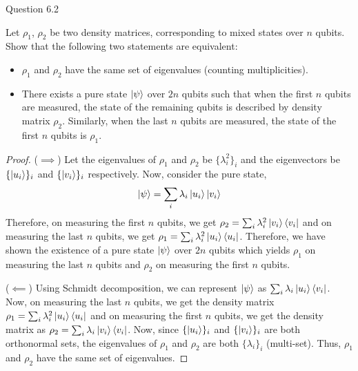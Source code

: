 \begin{solution}{Question 6.2}\label{ques:62}
    \begin{question}
        Let $\rho_1$, $\rho_2$ be two density matrices, corresponding to mixed states over $n$ qubits. Show that the following two statements are equivalent:
        \begin{itemize}
            \item $\rho_1$ and $\rho_2$ have the same set of eigenvalues (counting multiplicities).
            \item There exists a pure state $\ket{\psi}$ over $2n$ qubits such that when the first $n$ qubits are measured, the state of the remaining qubits is described by density matrix $\rho_2$. Similarly, when the last $n$ qubits are measured, the state of the first $n$ qubits is $\rho_1$.
        \end{itemize}
    \end{question}
    \tcblower{}
    \begin{proof}
        ($\implies$) Let the eigenvalues of $\rho_1$ and $\rho_2$ be $\{\lambda_i^2\}_i$ and the eigenvectors be $\{\ket{u_i}\}_i$ and $\{\ket{v_i}\}_i$ respectively. Now, consider the pure state,
        \begin{equation}
            \ket{\psi} = \sum_i\lambda_i\ket{u_i}\ket{v_i}
        \end{equation}
        Therefore, on measuring the first $n$ qubits, we get $\rho_2 = \sum_i\lambda_i^2\ket{v_i}\bra{v_i}$ and on measuring the last $n$ qubits, we get $\rho_1 = \sum_i\lambda_i^2\ket{u_i}\bra{u_i}$. Therefore, we have shown the existence of a pure state $\ket{\psi}$ over $2n$ qubits which yields $\rho_1$ on measuring the last $n$ qubits and $\rho_2$ on measuring the first $n$ qubits.

        ($\impliedby$) Using Schmidt decomposition, we can represent $\ket{\psi}$ as $\sum_i\lambda_i\ket{u_i}\bra{v_i}$. Now, on measuring the last $n$ qubits, we get the density matrix $\rho_1 = \sum_i\lambda_i^2\ket{u_i}\bra{u_i}$ and on measuring the first $n$ qubits, we get the density matrix as $\rho_2 = \sum_i\lambda_i\ket{v_i}\bra{v_i}$. Now, since $\{\ket{u_i}\}_i$ and $\{\ket{v_i}\}_i$ are both orthonormal sets, the eigenvalues of $\rho_1$ and $\rho_2$ are both $\{\lambda_i\}_i$ (multi-set). Thus, $\rho_1$ and $\rho_2$ have the same set of eigenvalues.
    \end{proof}
\end{solution}
